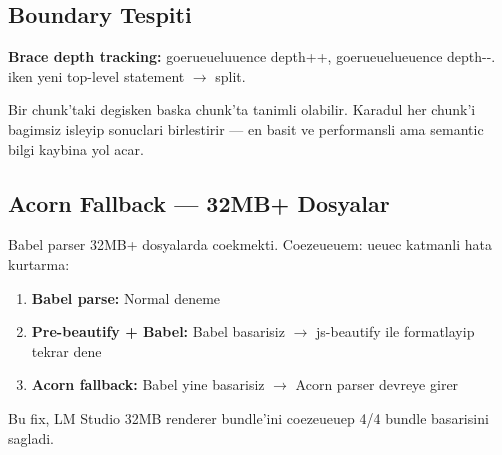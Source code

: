 \subsection{Boundary Tespiti}

\textbf{Brace depth tracking:} \code{\{} goerueueluuence depth++, \code{\}} goerueuelueuence depth-{}-.  iken yeni top-level statement $\to$ split.

\begin{uyari}
Bir chunk'taki degisken baska chunk'ta tanimli olabilir. Karadul her chunk'i bagimsiz isleyip sonuclari birlestirir --- en basit ve performansli ama semantic bilgi kaybina yol acar.
\end{uyari}

\subsection{Acorn Fallback --- 32MB+ Dosyalar}

Babel parser 32MB+ dosyalarda coekmekti. Coezeueuem: ueuec katmanli hata kurtarma:

\begin{enumerate}
\item \textbf{Babel parse:} Normal deneme
\item \textbf{Pre-beautify + Babel:} Babel basarisiz $\to$ js-beautify ile formatlayip tekrar dene
\item \textbf{Acorn fallback:} Babel yine basarisiz $\to$ Acorn parser devreye girer
\end{enumerate}

Bu fix, LM Studio 32MB renderer bundle'ini coezeueuep 4/4 bundle basarisini sagladi.
